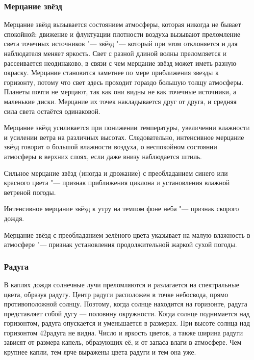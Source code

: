 \subsubsection{Мерцание звёзд}

Мерцание звёзд вызывается состоянием атмосферы, которая никогда не
бывает спокойной: движение и флуктуации плотности воздуха вызывают
преломление света точечных источников "--- звёзд "--- который при этом
отклоняется и для наблюдателя меняет яркость. Свет с разной длиной
волны преломляется и рассеивается неодинаково, в связи с чем мерцание
звёзд может иметь разную окраску. Мерцание становится заметнее по мере
приближения звезды к горизонту, потому что свет здесь проходит гораздо
большую толщу атмосферы. Планеты почти не мерцают, так как они видны
не как точечные источники, а маленькие диски. Мерцание их точек
накладывается друг от друга, и средняя сила света остаётся одинаковой.

Мерцание звёзд усиливается при понижении температуры, увеличении
влажности и усилении ветра на различных высотах. Следовательно,
интенсивное мерцание звёзд говорит о большой влажности воздуха, о
неспокойном состоянии атмосферы в верхних слоях, если даже внизу
наблюдается штиль.

 Сильное мерцание звёзд (иногда и дрожание) с преобладанием
синего или красного цвета "--- признак приближения циклона и установления
влажной ветреной погоды.

 Интенсивное мерцание звёзд к утру на темпом фоне неба "---
признак скорого дождя.

 Мерцание звёзд с преобладанием зелёного цвета указывает на
малую влажность в атмосфере "--- признак установления продолжительной
жаркой сухой погоды.

\subsubsection{Радуга}

В каплях дождя солнечные лучи преломляются и разлагается на
спектральные цвета, образуя радугу. Центр радуги расположен в точке
небосвода, прямо противоположной солнцу. Поэтому, когда солнце
находится на горизонте, радуга представляет собой дугу — половину
окружности. Когда солнце поднимается над горизонтом, радуга опускается
и уменьшается в размерах. При высоте солнца над горизонтом 42\gr радуга
не видна. Число и яркость цветов, а также ширина радуги зависят от
размера капель, образующих её, и от запаса влаги в атмосфере. Чем
крупнее капли, тем ярче выражены цвета радуги и тем она уже.

